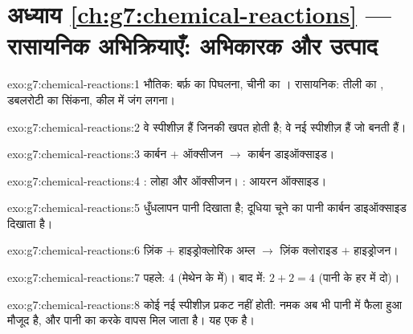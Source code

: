 \section*{अध्याय \ref{ch:g7:chemical-reactions} --- रासायनिक अभिक्रियाएँ: अभिकारक और उत्पाद}

\begin{solution}{exo:g7:chemical-reactions:1}
भौतिक: बर्फ़ का पिघलना, चीनी का । रासायनिक: तीली का ,
डबलरोटी का सिंकना, कील में जंग लगना।
\end{solution}

\begin{solution}{exo:g7:chemical-reactions:2}
 वे स्पीशीज़ हैं जिनकी खपत होती है;  वे नई स्पीशीज़ हैं जो
बनती हैं।
\end{solution}

\begin{solution}{exo:g7:chemical-reactions:3}
कार्बन $+$ ऑक्सीजन $\longrightarrow$ कार्बन डाइऑक्साइड।
\end{solution}

\begin{solution}{exo:g7:chemical-reactions:4}
: लोहा और ऑक्सीजन। : आयरन ऑक्साइड।
\end{solution}

\begin{solution}{exo:g7:chemical-reactions:5}
धुँधलापन पानी दिखाता है; दूधिया चूने का पानी कार्बन डाइऑक्साइड दिखाता है।
\end{solution}

\begin{solution}{exo:g7:chemical-reactions:6}
ज़िंक $+$ हाइड्रोक्लोरिक अम्ल $\longrightarrow$ ज़िंक क्लोराइड $+$ हाइड्रोजन।
\end{solution}

\begin{solution}{exo:g7:chemical-reactions:7}
पहले: 4 (मेथेन के  में)। बाद में: $2 + 2 = 4$ (पानी के हर 
में दो)।
\end{solution}

\begin{solution}{exo:g7:chemical-reactions:8}
कोई नई स्पीशीज़ प्रकट नहीं होती: नमक अब भी पानी में फैला हुआ मौजूद है,
और पानी का  करके वापस मिल जाता है। यह एक  है।
\end{solution}

